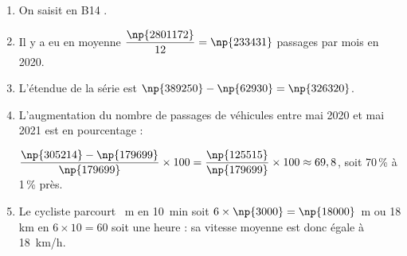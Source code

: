 \begin{enumerate}
\item %
On saisit en B14 .
\item %
Il y a eu en moyenne $\dfrac{\np{2801172}}{12} = \np{233431}$ passages par mois en 2020.
\item %
L'étendue de la série est $\np{389250} - \np{62930} = \np{326320}$.
\item %


L'augmentation du nombre de passages de véhicules entre mai 2020 et mai 2021 est en pourcentage :

$\dfrac{\np{305214} - \np{179699}}{\np{179699}} \times 100 = \dfrac{\np{125515}}{\np{179699}} \times 100 \approx 69,8$, soit 70\,\% à 1\,\% près.
\item %
Le cycliste parcourt ~m en 10~min soit $6 \times \np{3000} = \np{18000}$~m ou 18 km en $6 \times 10 = 60$ soit une heure : sa vitesse moyenne est donc égale à 18~km/h.
\end{enumerate}

\bigskip

